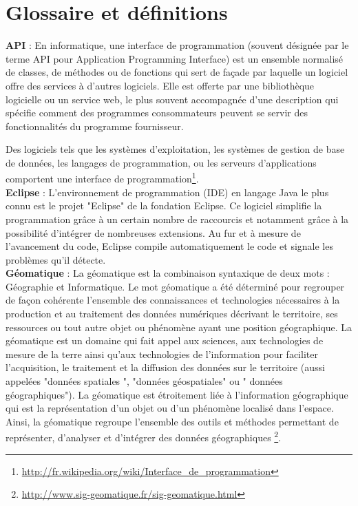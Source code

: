 \chapter{Glossaire et définitions}
\label{Glossaire}

\textbf{API} : En informatique, une interface de programmation (souvent désignée par le terme API pour Application Programming Interface) est un ensemble normalisé de classes, de méthodes ou de fonctions qui sert de façade par laquelle un logiciel offre des services à d'autres logiciels. Elle est offerte par une bibliothèque logicielle ou un service web, le plus souvent accompagnée d'une description qui spécifie comment des programmes consommateurs peuvent se servir des fonctionnalités du programme fournisseur.

Des logiciels tels que les systèmes d'exploitation, les systèmes de gestion de base de données, les langages de programmation, ou les serveurs d'applications comportent une interface de programmation\footnote{\url{http://fr.wikipedia.org/wiki/Interface_de_programmation}}.\\

\textbf{Eclipse} : L'environnement de programmation (IDE) en langage Java le plus connu est le projet "Eclipse" de la fondation Eclipse. Ce logiciel simplifie la programmation grâce à un certain nombre de raccourcis et notamment grâce à la possibilité d'intégrer de nombreuses extensions. Au fur et à mesure de l'avancement du code, Eclipse compile automatiquement le code et signale les problèmes qu'il détecte.\\

\textbf{Géomatique} : La géomatique est la combinaison syntaxique de deux mots : Géographie et Informatique.
Le mot géomatique a été déterminé pour regrouper de façon cohérente l’ensemble des connaissances et technologies nécessaires à la production et au traitement des données numériques décrivant le territoire, ses ressources ou tout autre objet ou phénomène ayant une position géographique.
La géomatique est un domaine qui fait appel aux sciences, aux technologies de mesure de la terre ainsi qu’aux technologies de l’information pour faciliter l’acquisition, le traitement et la diffusion des données sur le territoire (aussi appelées "données spatiales ", "données géospatiales" ou " données géographiques").
La géomatique est étroitement liée à l’information géographique qui est la représentation d’un objet ou d’un phénomène localisé dans l’espace.
Ainsi, la géomatique regroupe l’ensemble des outils et méthodes permettant de représenter, d’analyser et d’intégrer des données géographiques
\footnote{\url{http://www.sig-geomatique.fr/sig-geomatique.html}}.\\

